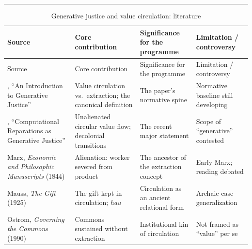 \documentclass[11pt,a4paper]{article}
\newcommand{\goldrule}{\noindent\textcolor{gold}{\rule{\linewidth}{0.6pt}}\par\vspace{0.4em}}
\begin{document}
\goldrule
\footnotesize
\begin{longtable}{Y Y Y Y}
\caption{Generative justice and value circulation: literature}\label{p07:tab:lit-genjust}\\
\toprule
{}
Source & Core contribution & Significance for the programme & Limitation / controversy \\
\midrule
\endfirsthead
{}
Source & Core contribution & Significance for the programme & Limitation / controversy \\
\midrule
\endhead
\textcite{eglash2016intro}, ``An Introduction to Generative Justice'' & Value circulation vs.\ extraction; the canonical definition & The paper's normative spine & Normative baseline still developing \\
\textcite{eglash2024computational}, ``Computational Reparations as Generative Justice'' & Unalienated circular value flow; decolonial transitions & The recent major statement & Scope of ``generative'' contested \\
Marx, \emph{Economic and Philosophic Manuscripts} (1844) & Alienation: worker severed from product & The ancestor of the extraction concept & Early Marx; reading debated \\
Mauss, \emph{The Gift} (1925) & The gift kept in circulation; \emph{hau} & Circulation as an ancient relational form & Archaic-case generalization \\
Ostrom, \emph{Governing the Commons} (1990) & Commons sustained without extraction & Institutional kin of circulation & Not framed as ``value'' per se \\
\bottomrule
\end{longtable}
\end{document}
